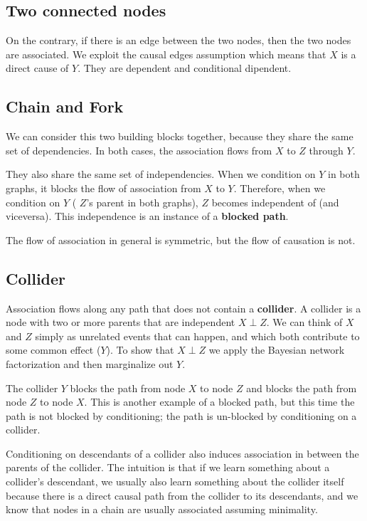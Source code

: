 \subsection{Two connected nodes}
On the contrary, if there is an edge between the two nodes, then the two nodes
are associated. We exploit the causal edges assumption which means that $X$ is
a direct cause of $Y$. They are dependent and conditional dipendent.
\subsection{Chain and Fork}
We can consider this two building blocks together, because they share the same
set of dependencies. In both cases, the association flows from $X$ to $Z$ through
$Y$.

They also share the same set of independencies. When we condition on $Y$ in both
graphs, it blocks the flow of association from $X$ to $Y$. Therefore, when we
condition on $Y$ ( $Z$'s parent in both graphs), $Z$ becomes independent of (and
viceversa). This independence is an instance of a \textbf{blocked path}.
\begin{note}
    The flow of association in general is symmetric, but the flow of causation
    is not.
\end{note}
\subsection{Collider}
Association flows along any path that does not contain a \textbf{collider}. A
collider is a node with two or more parents that are independent $X \perp Z$.
We can think of $X$ and $Z$ simply as unrelated events that can happen, and which
both contribute to some common effect ($Y$). To show that $X \perp Z$ we apply
the Bayesian network factorization and then marginalize out $Y$.

The collider $Y$ blocks the path from node $X$ to node $Z$ and blocks the path
from node $Z$ to node $X$. This is another example of a blocked path, but this
time the path is not blocked by conditioning; the path is un-blocked by conditioning
on a collider.

Conditioning on descendants of a collider also induces association in between the
parents of the collider. The intuition is that if we learn something about a
collider's descendant, we usually also learn something about the collider itself
because there is a direct causal path from the collider to its descendants, and
we know that nodes in a chain are usually associated assuming minimality.
